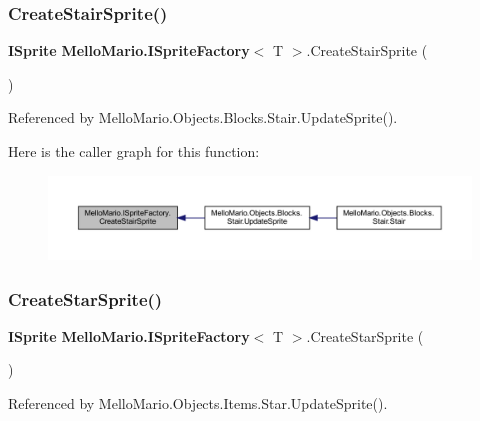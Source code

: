 \subsubsection{Create\+Stair\+Sprite()}
{\footnotesize\ttfamily \textbf{ I\+Sprite} \textbf{ Mello\+Mario.\+I\+Sprite\+Factory}$<$ T $>$.Create\+Stair\+Sprite (\begin{DoxyParamCaption}{ }\end{DoxyParamCaption})}



Referenced by Mello\+Mario.\+Objects.\+Blocks.\+Stair.\+Update\+Sprite().

Here is the caller graph for this function\+:
\nopagebreak
\begin{figure}[H]
\begin{center}
\leavevmode
\includegraphics[width=350pt]{interfaceMelloMario_1_1ISpriteFactory_a36dc4951dc1963b96c3ed654bfce316e_icgraph}
\end{center}
\end{figure}
\mbox{\label{interfaceMelloMario_1_1ISpriteFactory_ae94806cb98922cd925588620558de467}} 
\subsubsection{Create\+Star\+Sprite()}
{\footnotesize\ttfamily \textbf{ I\+Sprite} \textbf{ Mello\+Mario.\+I\+Sprite\+Factory}$<$ T $>$.Create\+Star\+Sprite (\begin{DoxyParamCaption}{ }\end{DoxyParamCaption})}



Referenced by Mello\+Mario.\+Objects.\+Items.\+Star.\+Update\+Sprite().

